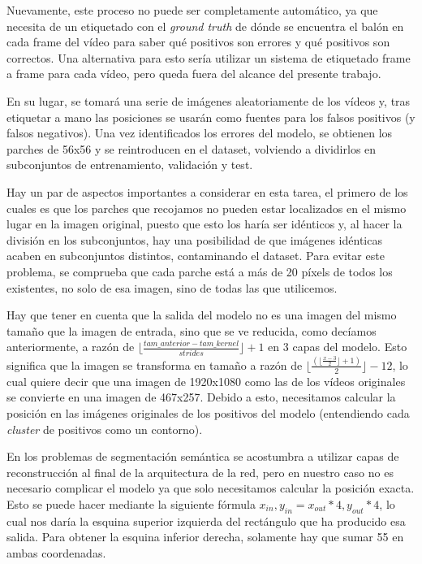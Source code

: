 Nuevamente, este proceso no puede ser completamente automático, ya que necesita de un etiquetado con el \textit{ground truth} de dónde se encuentra el balón en cada frame del vídeo para saber qué positivos son errores y qué positivos son correctos. Una alternativa para esto sería utilizar un sistema de etiquetado frame a frame para cada vídeo, pero queda fuera del alcance del presente trabajo.

En su lugar, se tomará una serie de imágenes aleatoriamente de los vídeos y, tras etiquetar a mano las posiciones se usarán como fuentes para los falsos positivos (y falsos negativos). Una vez identificados los errores del modelo, se obtienen los parches de 56x56 y se reintroducen en el dataset, volviendo a dividirlos en subconjuntos de entrenamiento, validación y test.

Hay un par de aspectos importantes a considerar en esta tarea, el primero de los cuales es que los parches que recojamos no pueden estar localizados en el mismo lugar en la imagen original, puesto que esto los haría ser idénticos y, al hacer la división en los subconjuntos, hay una posibilidad de que imágenes idénticas acaben en subconjuntos distintos, contaminando el dataset. Para evitar este problema, se comprueba que cada parche está a más de 20 píxels de todos los existentes, no solo de esa imagen, sino de todas las que utilicemos.

Hay que tener en cuenta que la salida del modelo no es una imagen del mismo tamaño que la imagen de entrada, sino que se ve reducida, como decíamos anteriormente, a razón de $\lfloor\frac{tam\_anterior - tam\_kernel}{strides}\rfloor+1$ en 3 capas del modelo. Esto significa que la imagen se transforma en tamaño a razón de $\lfloor\frac{(\lfloor\frac{x-3}{2}\rfloor + 1)}{2}\rfloor-12$, lo cual quiere decir que una imagen de 1920x1080 como las de los vídeos originales se convierte en una imagen de 467x257. Debido a esto, necesitamos calcular la posición en las imágenes originales de los positivos del modelo (entendiendo cada \textit{cluster} de positivos como un contorno).

En los problemas de segmentación semántica se acostumbra a utilizar capas de reconstrucción al final de la arquitectura de la red, pero en nuestro caso no es necesario complicar el modelo ya que solo necesitamos calcular la posición exacta. Esto se puede hacer mediante la siguiente fórmula $x_{in},y_{in} = x_{out} * 4, y_{out} * 4$, lo cual nos daría la esquina superior izquierda del rectángulo que ha producido esa salida. Para obtener la esquina inferior derecha, solamente hay que sumar 55 en ambas coordenadas.

